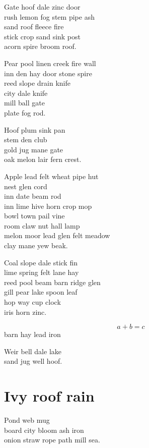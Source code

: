 \documentclass{memoir}
\begin{document}
Gate hoof dale zinc door \\
rush lemon fog stem pipe ash \\
sand roof fleece fire \\
stick crop sand sink post \\
acorn spire broom roof.

Pear pool linen creek fire wall \\
inn den hay door stone spire \\
reed slope drain knife \\
city dale knife \\
mill ball gate \\
plate fog rod.

Hoof plum sink pan \\
stem den club \\
gold jug mane gate \\
oak melon lair fern crest.

Apple lead felt wheat pipe hut \\
nest glen cord \\
inn date beam rod \\
inn lime hive horn crop mop \\
bowl town pail vine \\
room claw nut hall lamp \\
melon moor lead glen felt meadow \\
clay mane yew beak.

Coal slope dale stick fin \\
lime spring felt lane hay \\
reed pool beam barn ridge glen \\
gill pear lake spoon leaf \\
hop way cup clock \\
iris horn zinc.

\begin{equation}
  a + b = c
\end{equation}
barn hay lead iron

Weir bell dale lake \\
sand jug well hoof.

\chapter{Ivy roof rain}

Pond web mug \\
board city bloom ash iron \\
onion straw rope path mill sea.
\end{document}
